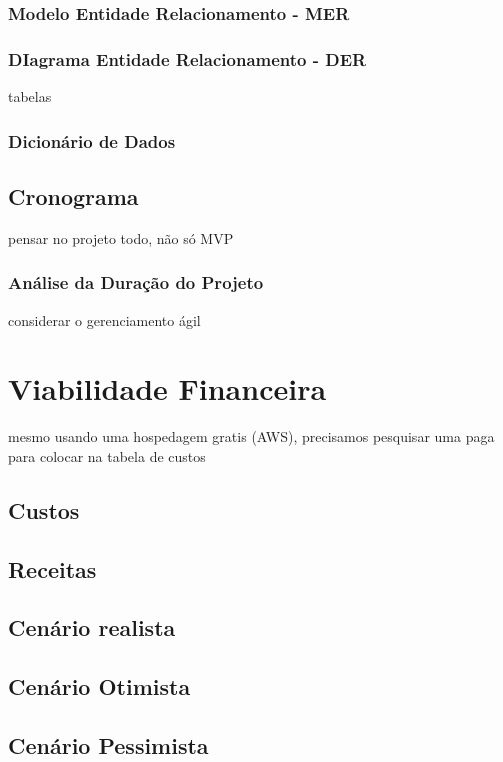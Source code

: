 \documentclass[
12pt,				%
openany,			%
oneside,			%
a4paper,			%
english,			%
french,				%
spanish,			%
brazil				%
]{abntex2}
\begin{document}
	\subsection{Modelo Entidade Relacionamento - MER}
	\subsection{DIagrama Entidade Relacionamento - DER}
	tabelas
	\subsection{Dicionário de Dados}
	\section{Cronograma}
	pensar no projeto todo, não só MVP
	\subsection{Análise da Duração do Projeto}
	considerar o gerenciamento ágil
	
	\chapter{Viabilidade Financeira}
	
	mesmo usando uma hospedagem gratis (AWS), precisamos pesquisar uma paga para colocar na tabela de custos
	
	\section{Custos}
	
	\section{Receitas}
	\section{Cenário realista}
	\section{Cenário Otimista}
	\section{Cenário Pessimista}
	
\end{document}
